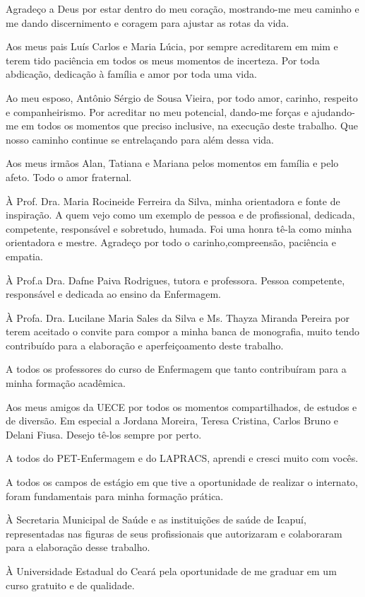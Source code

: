 Agradeço a Deus por estar dentro do meu coração, mostrando-me meu caminho e me dando discernimento e coragem para ajustar as rotas da vida. 

Aos meus pais Luís Carlos e Maria Lúcia, por sempre acreditarem em mim e terem tido paciência em todos os meus momentos de incerteza. Por toda abdicação, dedicação à família e amor por toda uma vida.

Ao meu esposo, Antônio Sérgio de Sousa Vieira, por todo amor, carinho, respeito e companheirismo. Por acreditar no meu potencial, dando-me forças e ajudando-me em todos os momentos que preciso inclusive, na execução deste trabalho. Que nosso caminho continue se entrelaçando para além dessa vida.

Aos meus irmãos Alan, Tatiana e Mariana pelos momentos em família e pelo afeto. Todo o amor fraternal.

À Prof. Dra. Maria Rocineide Ferreira da Silva, minha orientadora e fonte de inspiração. A quem vejo como um exemplo de pessoa e de profissional, dedicada, competente, responsável e sobretudo, humada. Foi uma honra tê-la como minha orientadora e mestre. Agradeço por todo o carinho,compreensão, paciência e empatia.

À Prof.a Dra. Dafne Paiva Rodrigues, tutora e professora. Pessoa competente, responsável e dedicada ao ensino da Enfermagem.

À Profa. Dra. Lucilane Maria Sales da Silva e Ms. Thayza Miranda Pereira por terem aceitado o convite para compor a minha banca de monografia, muito tendo contribuído para a elaboração e aperfeiçoamento deste trabalho.

A todos os professores do curso de Enfermagem que tanto contribuíram para a minha formação acadêmica.

Aos meus amigos da UECE por todos os momentos compartilhados, de estudos e de diversão. Em especial a Jordana Moreira, Teresa Cristina, Carlos Bruno e Delani Fiusa. Desejo tê-los sempre por perto.

A todos do PET-Enfermagem e do LAPRACS, aprendi e cresci muito com vocês.

A todos os campos de estágio em que tive a oportunidade de realizar o internato, foram fundamentais para minha formação prática.

À Secretaria Municipal de Saúde e as instituições de saúde de Icapuí, representadas nas figuras de seus profissionais que autorizaram e colaboraram para a elaboração desse trabalho.

À Universidade Estadual do Ceará pela oportunidade de me graduar em um curso gratuito e de qualidade.
